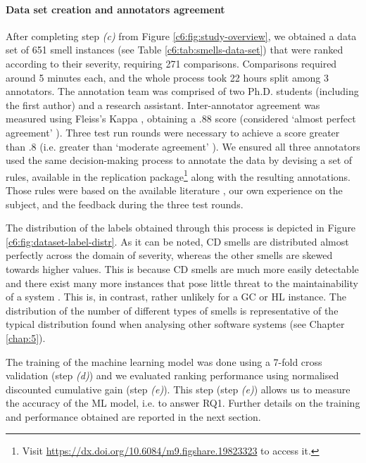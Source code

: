\paragraph{Data set creation and annotators agreement}
After completing step \emph{(c)} from Figure \ref{c6:fig:study-overview}, we obtained a data set of 651 smell instances (see Table \ref{c6:tab:smells-data-set}) that were ranked according to their severity, requiring 271 comparisons.
Comparisons required around 5 minutes each, and the whole process took 22 hours split among 3 annotators.
The annotation team was comprised of two Ph.D. students (including the first author) and a research assistant.
Inter-annotator agreement was measured using Fleiss's Kappa \cite{Fleiss1971}, obtaining a $.88$ score (considered `almost perfect agreement' \cite{Fleiss1971}).
Three test run rounds were necessary to achieve a score greater than $.8$ (i.e. greater than `moderate agreement' \cite{Fleiss1971}). 
We ensured all three annotators used the same decision-making process to annotate the data by devising a set of rules, available in the replication package\footnote{Visit \url{https://dx.doi.org/10.6084/m9.figshare.19823323} to access it.} along with the resulting annotations.
Those rules were based on the available literature \cite{Laval2012,AlMutawa2014}, our own experience on the subject, and the feedback during the three test rounds.

The distribution of the labels obtained through this process is depicted in Figure \ref{c6:fig:dataset-label-distr}.
As it can be noted, CD smells are distributed almost perfectly across the domain of severity, whereas the other smells are skewed towards higher values.
This is because CD smells are much more easily detectable and there exist many more instances that pose little threat to the maintainability of a system \cite{AlMutawa2014,Laval2012}.
This is, in contrast, rather unlikely for a GC or HL instance.
The distribution of the number of different types of smells is representative of the typical distribution found when analysing other software systems (see Chapter \ref{chap:5}).

The training of the machine learning model was done using a 7-fold cross validation (step \emph{(d)}) and we evaluated ranking performance using normalised discounted cumulative gain (step \emph{(e)}).
This step (step \emph{(e)}) allows us to measure the accuracy of the ML model, i.e. to answer RQ1.
Further details on the training and performance obtained are reported in the next section.

